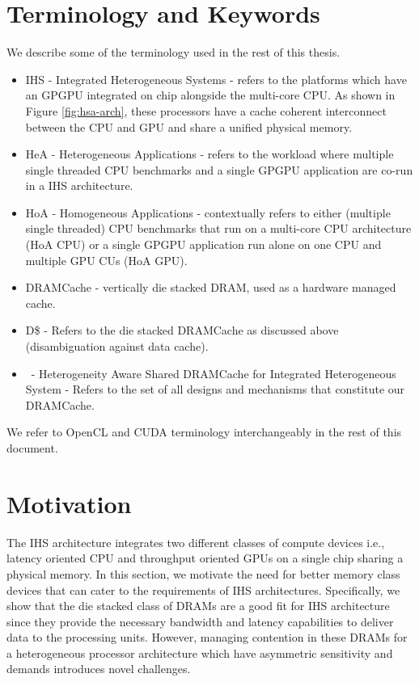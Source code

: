 \section{Terminology and Keywords}
We describe some of the terminology used in the rest of this thesis.
\begin{itemize}
	\item IHS - Integrated Heterogeneous Systems - refers to the platforms which have an GPGPU integrated on chip alongside the multi-core CPU. As shown in Figure \ref{fig:hsa-arch}, these processors have a cache coherent interconnect between the CPU and GPU and share a unified physical memory.
	\item HeA - Heterogeneous Applications - refers to the workload where multiple single threaded CPU benchmarks and a single GPGPU application are co-run in a IHS architecture.
	\item HoA - Homogeneous Applications - contextually refers to either (multiple single threaded) CPU benchmarks that run on a multi-core CPU architecture (HoA CPU) or a single GPGPU application run alone on one CPU and multiple GPU CUs (HoA GPU).
	\item DRAMCache - vertically die stacked DRAM, used as a hardware managed cache.
	\item D\$ - Refers to the die stacked DRAMCache as discussed above (disambiguation against data cache).
	\item \cachename\ - Heterogeneity Aware Shared DRAMCache for Integrated Heterogeneous System - Refers to the set of all designs and mechanisms that constitute our DRAMCache.
\end{itemize}
We refer to OpenCL \cite{opencl} and CUDA \cite{cuda} terminology interchangeably in the rest of this document.



\section{Motivation} \label{motivation}
The IHS architecture integrates two different classes of compute devices i.e., latency oriented CPU and throughput oriented GPUs on a single chip sharing a physical memory. In this section, we motivate the need for better memory class devices that can cater to the requirements of IHS architectures. Specifically, we show that the die stacked class of DRAMs are a good fit for IHS architecture since they provide the necessary bandwidth and latency capabilities to deliver data to the processing units. However, managing contention in these DRAMs for a heterogeneous processor architecture which have asymmetric sensitivity and demands introduces novel challenges.

